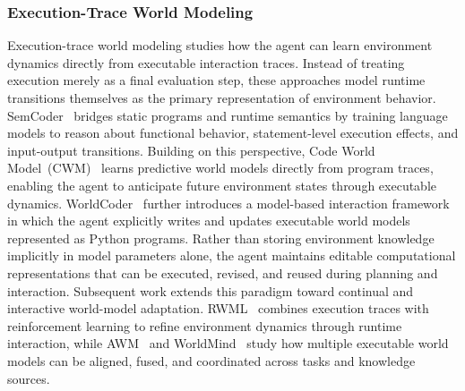 \documentclass{llmxive}
\begin{document}
\subsubsection{Execution-Trace World Modeling}
Execution-trace world modeling studies how the agent can learn
environment dynamics directly from executable interaction traces.
Instead of treating execution merely as a final evaluation step,
these approaches model runtime transitions themselves as the
primary representation of environment behavior.
SemCoder~\cite{ding2024semcoder} bridges static programs and
runtime semantics by training language models to reason about
functional behavior, statement-level execution effects, and
input-output transitions.
Building on this perspective, Code World
Model~(CWM)~\cite{copet2025cwm} learns predictive world models
directly from program traces, enabling the agent to anticipate
future environment states through executable dynamics.
WorldCoder~\cite{tang2024worldcoder} further introduces a
model-based interaction framework in which the agent explicitly
writes and updates executable world models represented as Python
programs.
Rather than storing environment knowledge implicitly in model
parameters alone, the agent maintains editable computational
representations that can be executed, revised, and reused during
planning and interaction.
Subsequent work extends this paradigm toward continual and
interactive world-model adaptation.
RWML~\cite{yu2026reinforcement} combines execution traces with
reinforcement learning to refine environment dynamics through
runtime interaction, while
AWM~\cite{wang2026agent} and
WorldMind~\cite{ren2026aligning} study how multiple executable
world models can be aligned, fused, and coordinated across tasks
and knowledge sources.
\end{document}
